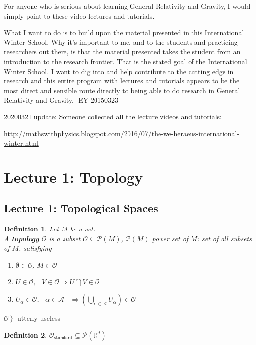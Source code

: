 \documentclass[10pt]{amsart}
\newtheorem{definition}{Definition}
\begin{document}
\begin{multicols*}{2}
For anyone who is serious about learning General Relativity and Gravity, I would simply point to these video lectures and tutorials.  

What I want to do is to build upon the material presented in this International Winter School.  Why it's important to me, and to the students and practicing researchers out there, is that the material presented takes the student from an introduction to the research frontier.  That is the stated goal of the International Winter School.  I want to dig into and help contribute to the cutting edge in research and this entire program with lectures and tutorials appears to be the most direct and sensible route directly to being able to do research in General Relativity and Gravity. -EY 20150323

20200321 update: Someone collected all the lecture videos and tutorials:

\url{http://mathswithphysics.blogspot.com/2016/07/the-we-heraeus-international-winter.html}

\section{Lecture 1: Topology}

\subsection{Lecture 1: Topological Spaces}

\begin{definition}
	Let $M$ be a set.  \\
	A \textbf{topology} $\mathcal{O}$ is a subset $\mathcal{O} \subseteq \mathcal{P}(M)$, $\mathcal{P}(M)$ power set of $M$: set of all subsets of $M$. satisfying
	\begin{enumerate}
		\item[(i)] $\emptyset \in \mathcal{O}$, $M \in \mathcal{O}$ 
		\item[(ii)] $ U \in \mathcal{O}$, \, $V \in \mathcal{O} \Longrightarrow U\bigcap V \in \mathcal{O}$ 
		\item[(iii)] $U_{\alpha} \in \mathcal{O}$, \, $\alpha \in \mathcal{A}$ \, $\Longrightarrow \left( \bigcup_{\alpha \in \mathcal{A}} U_{\alpha} \right) \in \mathcal{O}$
	\end{enumerate}
\end{definition}

$ \left. \mathcal{O} \right\} $ utterly useless

\begin{definition}
	$\mathcal{O}_{\text{standard}} \subseteq \mathcal{P}(\mathbb{R}^d)$
\end{definition}


\end{multicols*}
\end{document}
